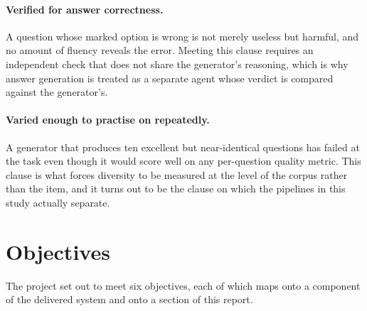 \paragraph{Verified for answer correctness.} A question whose marked option is
wrong is not merely useless but harmful, and no amount of fluency reveals the
error. Meeting this clause requires an independent check that does not share the
generator's reasoning, which is why answer generation is treated as a separate
agent whose verdict is compared against the generator's.

\paragraph{Varied enough to practise on repeatedly.} A generator that produces
ten excellent but near-identical questions has failed at the task even though it
would score well on any per-question quality metric. This clause is what forces
diversity to be measured at the level of the corpus rather than the item, and it
turns out to be the clause on which the pipelines in this study actually
separate.

\section{Objectives}
\label{sec:intro-objectives}

The project set out to meet six objectives, each of which maps onto a component
of the delivered system and onto a section of this report.

